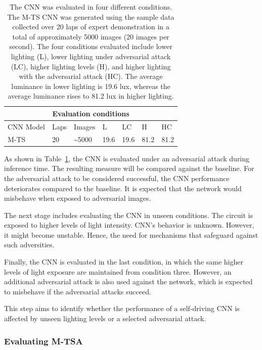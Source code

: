 \documentclass[12pt]{article}
\begin{document}
\begin{table}[h]
\begin{center}
\begin{tabular}{ |p{3cm}|p{1cm}|p{2cm}|p{1cm}|p{1cm}|p{1cm}|p{1cm}|  }
 \hline
 \multicolumn{7}{|c|}{Evaluation conditions} \\
 \hline
 CNN Model & Laps & Images & L & LC & H & HC \\
 \hline
M-TS & 20 & \textasciitilde5000 & 19.6 & 19.6  & 81.2 & 81.2\\
\hline
\end{tabular}
\caption{\label{tab:cond1method}The CNN was evaluated in four different conditions. The M-TS CNN was generated using the sample data collected over 20 laps of expert demonstration in a total of approximately 5000 images (20 images per second). The four conditions evaluated include lower lighting (L), lower lighting under adversarial attack (LC), higher lighting levels (H), and higher lighting with the adversarial attack (HC). The average luminance in lower lighting is 19.6 lux, whereas the average luminance rises to 81.2 lux in higher lighting.  }
\end{center}
\end{table}

As shown in Table~\ref{tab:cond1method}, the CNN is evaluated under an adversarial attack during inference time. The resulting measure will be compared against the baseline. For the adversarial attack to be considered successful, the CNN performance deteriorates compared to the baseline. It is expected that the network would misbehave when exposed to adversarial images.

The next stage includes evaluating the CNN in unseen conditions. The circuit is exposed to higher levels of light intensity. CNN's behavior is unknown. However, it might become unstable. Hence, the need for mechanisms that safeguard against such adversities.

Finally, the CNN is evaluated in the last condition, in which the same higher levels of light exposure are maintained from condition three. However, an additional adversarial attack is also used against the network, which is expected to misbehave if the adversarial attacks succeed. 

This step aims to identify whether the performance of a self-driving CNN is affected by unseen lighting levels or a selected adversarial attack.

\subsubsection{Evaluating M-TSA}
\end{document}
